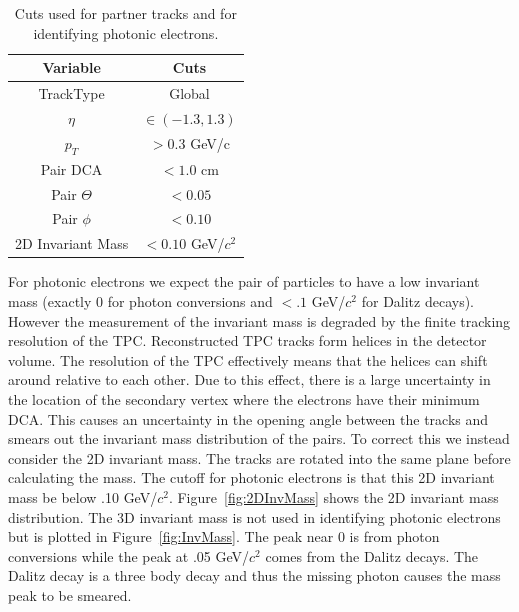 \begin{table}
\centering
\begin{tabular}{|c|c|}
\hline
Variable         & Cuts \\
\hline
TrackType   & Global \\
\hline
$\eta$   & $\in(-1.3,1.3)$ \\
\hline
$p_T$   & $> 0.3$ GeV/c \\
\hline
Pair DCA  & $< 1.0$ cm \\
\hline
Pair $\Theta$   & $< 0.05$ \\
\hline
Pair $\phi$   & $< 0.10$ \\
\hline
2D Invariant Mass   & $< 0.10$ GeV/$c^2$ \\
\hline
\end{tabular}
\caption[Photonic Electron Cuts]{Cuts used for partner tracks and for identifying photonic electrons.}
\label{tab:pe_cuts}
\end{table}

For photonic electrons we expect the pair of particles to have a low invariant mass (exactly 0 for photon conversions and $< .1$ GeV/$c^2$ for Dalitz decays). However the measurement of the invariant mass is degraded by the finite tracking resolution of the TPC. Reconstructed TPC tracks form helices in the detector volume. The resolution of the TPC effectively means that the helices can shift around relative to each other. Due to this effect, there is a large uncertainty in the location of the secondary vertex where the electrons have their minimum DCA. This causes an uncertainty in the opening angle between the tracks and smears out the invariant mass distribution of the pairs. To correct this we instead consider the 2D invariant mass. The tracks are rotated into the same plane before calculating the mass. The cutoff for photonic electrons is that this 2D invariant mass be below .10 GeV/$c^2$. Figure~\ref{fig:2DInvMass} shows the 2D invariant mass distribution. The 3D invariant mass is not used in identifying photonic electrons but is plotted in Figure~\ref{fig:InvMass}. The peak near 0 is from photon conversions while the peak at .05 GeV/$c^2$ comes from the Dalitz decays. The Dalitz decay is a three body decay and thus the missing photon causes the mass peak to be smeared.

